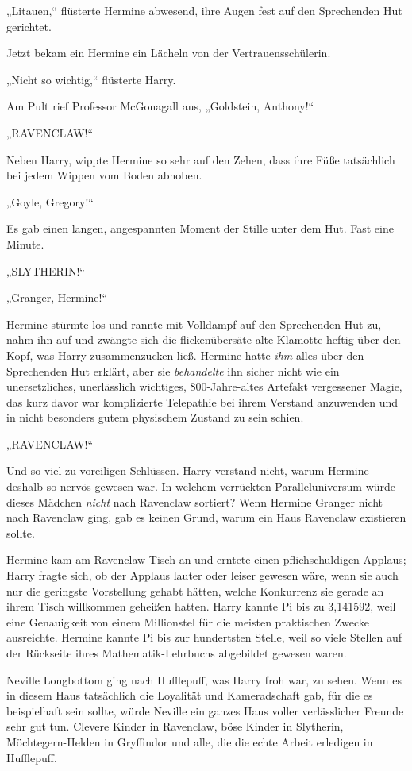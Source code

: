 {„Litauen,“ flüsterte Hermine abwesend, ihre Augen fest auf den Sprechenden Hut gerichtet.

Jetzt bekam ein Hermine ein Lächeln von der Vertrauensschülerin.

„Nicht so wichtig,“ flüsterte Harry.

Am Pult rief Professor McGonagall aus, „Goldstein, Anthony!“

„RAVENCLAW!“

Neben Harry, wippte Hermine so sehr auf den Zehen, dass ihre Füße tatsächlich bei jedem Wippen vom Boden abhoben.

„Goyle, Gregory!“

Es gab einen langen, angespannten Moment der Stille unter dem Hut. Fast eine Minute.

„SLYTHERIN!“

„Granger, Hermine!“

Hermine stürmte los und rannte mit Volldampf auf den Sprechenden Hut zu, nahm ihn auf und zwängte sich die flickenübersäte alte Klamotte heftig über den Kopf, was Harry zusammenzucken ließ. Hermine hatte \emph{ihm} alles über den Sprechenden Hut erklärt, aber sie \emph{behandelte} ihn sicher nicht wie ein unersetzliches, unerlässlich wichtiges, 800-Jahre-altes Artefakt vergessener Magie, das kurz davor war komplizierte Telepathie bei ihrem Verstand anzuwenden und in nicht besonders gutem physischem Zustand zu sein schien.

„RAVENCLAW!“

Und so viel zu voreiligen Schlüssen. Harry verstand nicht, warum Hermine deshalb so nervös gewesen war. In welchem verrückten Paralleluniversum würde dieses Mädchen \emph{nicht} nach Ravenclaw sortiert? Wenn Hermine Granger nicht nach Ravenclaw ging, gab es keinen Grund, warum ein Haus Ravenclaw existieren sollte.

Hermine kam am Ravenclaw-Tisch an und erntete einen pflichschuldigen Applaus; Harry fragte sich, ob der Applaus lauter oder leiser gewesen wäre, wenn sie auch nur die geringste Vorstellung gehabt hätten, welche Konkurrenz sie gerade an ihrem Tisch willkommen geheißen hatten. Harry kannte Pi bis zu 3,141592, weil eine Genauigkeit von einem Millionstel für die meisten praktischen Zwecke ausreichte. Hermine kannte Pi bis zur hundertsten Stelle, weil so viele Stellen auf der Rückseite ihres Mathematik-Lehrbuchs abgebildet gewesen waren.

Neville Longbottom ging nach Hufflepuff, was Harry froh war, zu sehen. Wenn es in diesem Haus tatsächlich die Loyalität und Kameradschaft gab, für die es beispielhaft sein sollte, würde Neville ein ganzes Haus voller verlässlicher Freunde sehr gut tun. Clevere Kinder in Ravenclaw, böse Kinder in Slytherin, Möchtegern-Helden in Gryffindor und alle, die die echte Arbeit erledigen in Hufflepuff.

}
